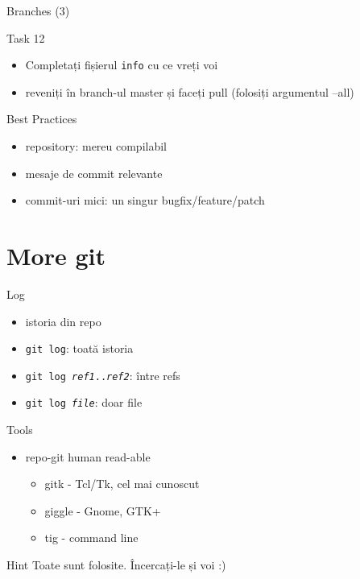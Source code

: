 \documentclass{beamer}
\begin{document}

\begin{frame}{Branches (3)}
  \begin{alertblock}{Task 12}
    \begin{itemize}
      \item Completați fișierul \texttt{info} cu ce vreți voi
      \item reveniți în branch-ul master și faceți pull (folosiți argumentul
      --all)
    \end{itemize}
  \end{alertblock}
\end{frame}

\begin{frame}{Best Practices}
  \begin{itemize}
    \item repository: mereu compilabil
    \item mesaje de commit relevante
    \item commit-uri mici: un singur bugfix/feature/patch
  \end{itemize}
\end{frame}

\section{More git}

\begin{frame}{Log}
  \begin{itemize}
    \item istoria din repo
    \item \texttt{git log}: toată istoria
    \item \texttt{git log \textit{ref1}..\textit{ref2}}: între refs
    \item \texttt{git log \textit{file}}: doar file
  \end{itemize}
\end{frame}

\begin{frame}{Tools}
  \begin{itemize}
    \item repo-git human read-able
    \begin{itemize}
      \item gitk - Tcl/Tk, cel mai cunoscut
      \item giggle - Gnome, GTK+
      \item tig - command line
    \end{itemize}
  \end{itemize}
  \begin{alertblock}{Hint}
    Toate sunt folosite. Încercați-le și voi :)
  \end{alertblock}
\end{frame}
\end{document}
